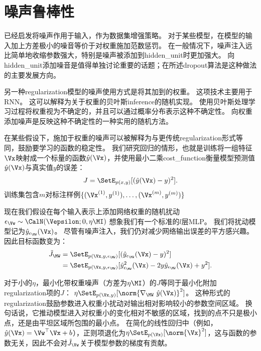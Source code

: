 
\section{噪声鲁棒性}
\label{sec:noise_robustness}

已经启发将噪声作用于输入，作为数据集增强策略。
对于某些模型，在模型的输入加上方差极小的噪音等价于对权重施加范数惩罚\citep{Bishop1995,bishop95training}。
在一般情况下，噪声注入远比简单地收缩参数强大，特别是噪声被添加到\gls{hidden_unit}时更加强大。
向\gls{hidden_unit}添加噪音是值得单独讨论重要的话题；在所述\gls{dropout}算法是这种做法的主要发展方向。

另一种\gls{regularization}模型的噪声使用方式是将其加到的权重。
这项技术主要用于\gls{RNN}\citep{JimGilesHorne1996,Graves-2011}。
这可以解释为关于权重的贝叶斯\gls{inference}的随机实现。
使用贝叶斯处理学习过程将权重视为不确定的，并且可以通过概率分布表示这种不确定性。
向权重添加噪声是反映这种不确定性的一种实用的随机方法。

在某些假设下，施加于权重的噪声可以被解释为与更传统\gls{regularization}形式等同，鼓励要学习的函数的稳定性。
我们研究回归的情形，也就是训练将一组特征$\Vx$映射成一个标量的函数$\hat y(\Vx)$，并使用最小二乘\gls{cost_function}衡量模型预测值$\hat y(\Vx)$与真实值$y$的误差：
\begin{align}
 J = \SetE_{p(x,y)}[(\hat y(\Vx) - y)^2].
\end{align}
训练集包含$m$对标注样例$\{(\Vx^{(1)}, y^{(1)}),\dots,(\Vx^{(m)}, y^{(m)})\}$

现在我们假设在每个输入表示上添加网络权重的随机扰动$\epsilon_{\Vw} \sim \CalN(\Vepsilon;0, \eta\MI )$
想象我们有一个标准的$l$层MLP。
我们将扰动模型记为$\hat y_{\epsilon_{\MW}} (\Vx)$。
尽管有噪声注入，我们仍对减少网络输出误差的平方感兴趣。
因此目标函数变为：
\begin{align}
 \tilde J_{\MW} &= \SetE_{p(\Vx,y,\epsilon_{\MW})}[(\hat y_{\epsilon_{\MW}}(\Vx) - y)^2] \\
   &=  \SetE_{p(\Vx,y,\epsilon_{\MW})}[\hat y_{\epsilon_{\MW}}^2(\Vx) -  2y\hat y_{\epsilon_{\MW}}
   (\Vx)+ y^2] .
\end{align}

对于小的$\eta$，最小化带权重噪声（方差为$\eta \MI$）的$J$等同于最小化附加\gls{regularization}项的$J$：
$ \eta \SetE_{p(\Vx,y)}[\norm{\nabla_{\MW}~\hat y(\Vx)}^2]$。
这种形式的\gls{regularization}鼓励参数进入权重小扰动对输出相对影响较小的参数空间区域。
换句话说，它推动模型进入对权重小的变化相对不敏感的区域，找到的点不只是极小点，还是由平坦区域所包围的最小点\citep{Hochreiter95}。
在简化的线性回归中（例如，$\hat y(\Vx) = \Vw^\top \Vx + b$），正则项退化为$ \eta \SetE_{p(\Vx)}[\norm{\Vx}^2]$，这与函数的参数无关，因此不会对$\tilde J_{\Vw}$关于模型参数的梯度有贡献。

